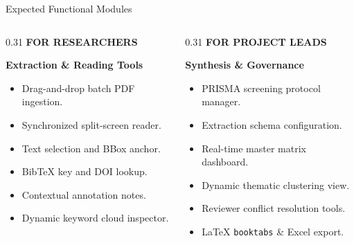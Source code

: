 \documentclass[aspectratio=169,10pt]{beamer}
\begin{document}
\begin{frame}{Expected Functional Modules}
\vspace{-0.15cm}
\begin{columns}[T]
  \begin{column}{0.31\textwidth}
    {\fontsize{7pt}{8.5pt}\selectfont\bfseries\color{SubText} FOR RESEARCHERS}\par\vspace{2pt}
    {\fontsize{9.5pt}{11.5pt}\selectfont\bfseries\color{DarkText} Extraction \& Reading Tools}\par\vspace{4pt}
    {\fontsize{7.2pt}{9.2pt}\selectfont\color{DarkText}
    \begin{itemize}
      \item Drag-and-drop batch PDF ingestion.
      \item Synchronized split-screen reader.
      \item Text selection and BBox anchor.
      \item BibTeX key and DOI lookup.
      \item Contextual annotation notes.
      \item Dynamic keyword cloud inspector.
    \end{itemize}}
  \end{column}

  \begin{column}{0.31\textwidth}
    {\fontsize{7pt}{8.5pt}\selectfont\bfseries\color{SubText} FOR PROJECT LEADS}\par\vspace{2pt}
    {\fontsize{9.5pt}{11.5pt}\selectfont\bfseries\color{DarkText} Synthesis \& Governance}\par\vspace{4pt}
    {\fontsize{7.2pt}{9.2pt}\selectfont\color{DarkText}
    \begin{itemize}
      \item PRISMA screening protocol manager.
      \item Extraction schema configuration.
      \item Real-time master matrix dashboard.
      \item Dynamic thematic clustering view.
      \item Reviewer conflict resolution tools.
      \item LaTeX \texttt{booktabs} \& Excel export.
    \end{itemize}}
  \end{column}


\end{columns}
\end{frame}
\end{document}
